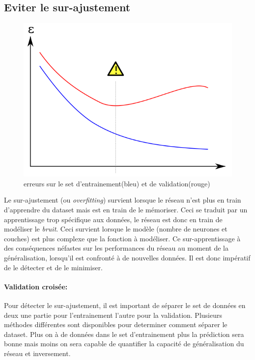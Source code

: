 \documentclass[11pt]{article}
\begin{document}
\subsection{Eviter le sur-ajustement}\label{overfitting}
\begin{figure}[htp]
	\centering
	\includegraphics[scale=.4]{img/overfitting.png}
	\caption{erreurs sur le set d'entrainement(bleu) et de validation(rouge)}
\end{figure}
Le sur-ajustement (ou {\em overfitting}) survient lorsque le r\'eseau n'est plus
en train d'apprendre du dataset mais est en train de le m\'emoriser. Ceci se
traduit par un apprentissage trop sp\'ecifique aux donn\'ees, le r\'eseau est
donc en train de mod\'eliser le {\em bruit}. Ceci survient lorsque le mod\`ele
(nombre de neurones et couches) est plus complexe que la fonction \`a
mod\'eliser. Ce sur-apprentissage \`a des cons\'equences n\'efastes sur les
performances du r\'eseau au moment de la g\'en\'eralisation, lorsqu'il est
confront\'e \`a de nouvelles donn\'ees. Il est donc imp\'eratif de le
d\'etecter et de le minimiser.

\paragraph{Validation crois\'ee:} Pour d\'etecter le sur-ajustement, il est
important de s\'eparer le set de donn\'ees en deux une partie pour l'entrainement
l'autre pour la validation. Plusieurs m\'ethodes diff\'erentes sont disponibles
pour determiner comment s\'eparer le dataset. Plus on \`a de donn\'ees dans le set
d'entrainement plus la pr\'ediction sera bonne mais moins on sera capable de
quantifier la capacit\'e de g\'en\'eralisation du r\'eseau et inversement.
\end{document}
